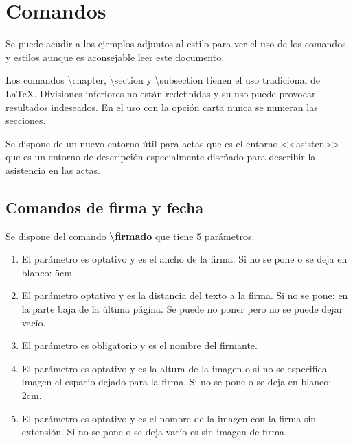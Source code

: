 \documentclass[numerado,carta]{plantillasEPS} %
\begin{document}
\chapter{Comandos}

Se puede acudir a los ejemplos adjuntos al estilo para ver el uso de los comandos y estilos aunque es aconsejable leer este documento.

Los comandos {\textbackslash}chapter, {\textbackslash}section y {\textbackslash}subsection tienen el uso tradicional de \LaTeX. Divisiones inferiores no están redefinidas y su uso puede provocar resultados indeseados. En el uso con la opción carta nunca se numeran las secciones.

Se dispone de un nuevo entorno útil para actas que es el entorno <<asisten>> que es un entorno de descripción especialmente diseñado para describir la asistencia en las actas.

\section{Comandos de firma y fecha}
Se dispone del comando \textbf{{\textbackslash}firmado} que tiene 5 parámetros:
\begin{enumerate}
    \item El parámetro es optativo y es el ancho de la firma. Si no se pone o se deja en blanco: 5cm
    \item El parámetro optativo y es la distancia del texto a la firma. Si no se pone: en la parte baja de la última página. Se puede no poner pero no se puede dejar vacío.
    \item El parámetro es obligatorio y es el nombre del firmante.
    \item El parámetro es optativo y es la altura de la imagen o si no se especifica imagen el espacio dejado para la firma. Si no se pone o se deja en blanco: 2cm.
    \item El parámetro es optativo y es el nombre de la imagen con la firma sin extensión. Si no se pone o se deja vacío es sin imagen de firma.
\end{enumerate}
\end{document}
